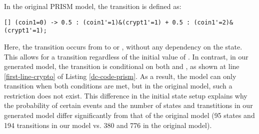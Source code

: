 In the original PRISM model, the transition is defined as:
\begin{lstlisting}[style=prism-color, frame=none, numbers=none]
   [] (coin1=0) -> 0.5 : (coin1'=1)&(crypt1'=1) + 0.5 : (coin1'=2)&(crypt1'=1);
   \end{lstlisting}
Here, the transition occurs from  to  or , without any dependency on the  state. This allows for a transition regardless of the initial value of .
In contrast, in our generated model, the transition is conditional on both  and , as shown at line \ref{first-line-crypto} of Listing \ref{dc-code-prism}.
As a result, the model can only transition when both conditions are met, but in the original model, such a restriction does not exist. This difference in the initial state setup explains why the probability of certain events and the number of states and transtitions in our generated model differ significantly from that of the original model (95 states and 194 transitions in our model vs. 380 and 776 in the original model).

